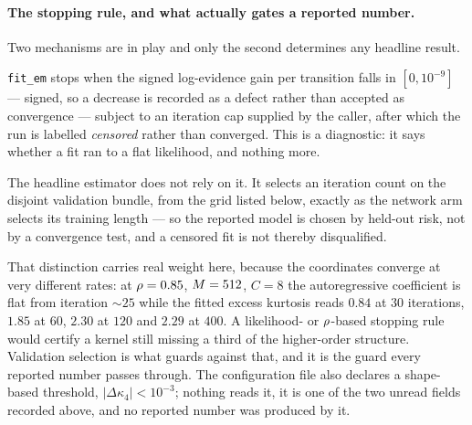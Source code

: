 \paragraph{The stopping rule, and what actually gates a reported number.} Two mechanisms are in
play and only the second determines any headline result.

\texttt{fit\_em} stops when the signed log-evidence gain per transition falls in $[0,10^{-9}]$ ---
signed, so a decrease is recorded as a defect rather than accepted as convergence --- subject to an
iteration cap supplied by the caller, after which the run is labelled \emph{censored} rather than
converged. This is a diagnostic: it says whether a fit ran to a flat likelihood, and nothing more.

The headline estimator does not rely on it. It selects an iteration count on the disjoint
validation bundle, from the grid listed below, exactly as the network arm selects its training
length --- so the reported model is chosen by held-out risk, not by a convergence test, and a
censored fit is not thereby disqualified.

That distinction carries real weight here, because the coordinates converge at very different
rates: at $\rho=0.85$, $M=512$, $C=8$ the autoregressive coefficient is flat from iteration
${\sim}25$ while the fitted excess kurtosis reads $0.84$ at $30$ iterations, $1.85$ at $60$,
$2.30$ at $120$ and $2.29$ at $400$. A likelihood- or $\rho$-based stopping rule would certify a
kernel still missing a third of the higher-order structure. Validation selection is what guards
against that, and it is the guard every reported number passes through. The configuration file
also declares a shape-based threshold, $|\Delta\kappa_4|<10^{-3}$; nothing reads it, it is one of
the two unread fields recorded above, and no reported number was produced by it.

